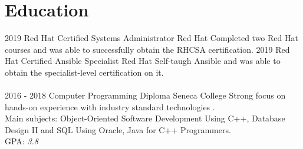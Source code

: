 \documentclass[]{friggeri-cv}
\begin{document}
\section{Education}
\begin{entrylist}
  \entry
    {2019}
    {Red Hat Certified Systems Administrator}
    {Red Hat}
    {Completed two Red Hat courses and was able to successfully obtain the RHCSA certification.}
  \entry
    {2019}
    {Red Hat Certified Ansible Specialist}
    {Red Hat}
    {Self-taugh Ansible and was able to obtain the specialist-level certification on it.\\
    \emph{}\\}
  \entry
    {2016 - 2018}
    {Computer Programming Diploma}
    {Seneca College}
    {Strong focus on hands-on experience with industry standard technologies .\\
    Main subjects: Object-Oriented Software Development Using C++, Database Design II and SQL Using Oracle, Java for C++ Programmers.\\
    {GPA: \emph{3.8}\\}
    \emph{}\\}
\end{entrylist}
\end{document}

